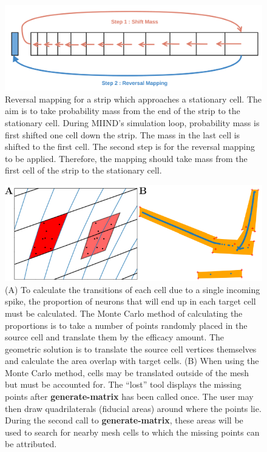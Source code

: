 \documentclass[utf8]{frontiers_suppmat} %
\begin{document}
\begin{figure}[!htb]
  \centering
  \includegraphics[width=\columnwidth]{images/reversal.png}
  \caption{Reversal mapping for a strip which approaches a stationary cell. The aim is to take probability mass from the end of the strip to the stationary cell. During MIIND's simulation loop, probability mass is first shifted one cell down the strip. The mass in the last cell is shifted to the first cell. The second step is for the reversal mapping to be applied. Therefore, the mapping should take mass from the first cell of the strip to the stationary cell.}
  \label{fig:reversal}
\end{figure}

\begin{figure}[tb]
  \centering
    \includegraphics[width=\linewidth]{images/lost_full_figure.pdf}
  \caption{(A) To calculate the transitions of each cell due to a single incoming spike, the proportion of neurons that will end up in each target cell must be calculated. The Monte Carlo method of calculating the proportions is to take a number of points randomly placed in the source cell and translate them by the efficacy amount. The geometric solution is to translate the source cell vertices themselves and calculate the area overlap with target cells. (B) When using the Monte Carlo method, cells may be translated outside of the mesh but must be accounted for. The ``lost'' tool displays the missing points after \textbf{generate-matrix} has been called once. The user may then draw quadrilaterals (fiducial areas) around where the points lie. During the second call to \textbf{generate-matrix}, these areas will be used to search for nearby mesh cells to which the missing points can be attributed.}
  \label{fig:transitionlost}
\end{figure}
\end{document}
